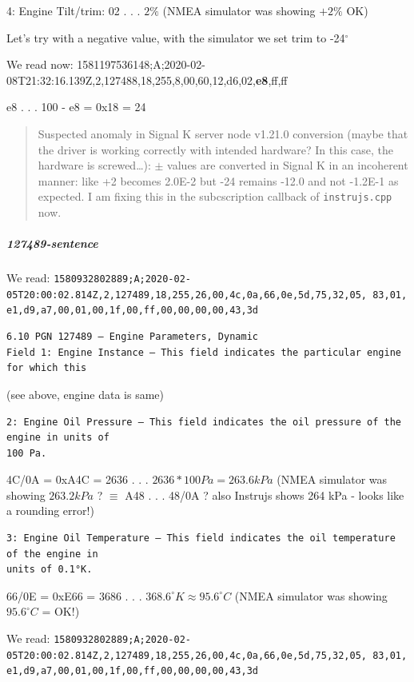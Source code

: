 \documentclass[11pt]{article}
\begin{document}
    4: Engine Tilt/trim: 02 . . . \(2\%\) (NMEA simulator was showing
\(+2\%\) OK)

    Let's try with a negative value, with the simulator we set trim to
-24\(^{\circ}\)

    We read now:
1581197536148;A;2020-02-08T21:32:16.139Z,2,127488,18,255,8,00,60,12,d6,02,\textbf{e8},ff,ff

    e8 . . . 100 - e8 = 0x18 = 24

    \begin{quote}
Suspected anomaly in Signal K server node v1.21.0 conversion (maybe that
the driver is working correctly with intended hardware? In this case,
the hardware is screwed\ldots): \(\pm\) values are converted in Signal K
in an incoherent manner: like +2 becomes 2.0E-2 but -24 remains -12.0
and not -1.2E-1 as expected. I am fixing this in the subcscription
callback of \texttt{instrujs.cpp} now.
\end{quote}

    \hypertarget{sentence}{%
\subparagraph{127489-sentence}\label{sentence}}

    We read:
\texttt{1580932802889;A;2020-02-05T20:00:02.814Z,2,127489,18,255,26,00,4c,0a,66,0e,5d,75,32,05,\ 83,01,e1,d9,a7,00,01,00,1f,00,ff,00,00,00,00,43,3d}

\begin{verbatim}
6.10 PGN 127489 – Engine Parameters, Dynamic
Field 1: Engine Instance – This field indicates the particular engine for which this
\end{verbatim}

(see above, engine data is same)

\begin{verbatim}
2: Engine Oil Pressure – This field indicates the oil pressure of the engine in units of
100 Pa.
\end{verbatim}

4C/0A = 0xA4C = 2636 . . . \(2636 * 100Pa = 263.6kPa\) (NMEA simulator
was showing \(263.2kPa\) ? \(\equiv\) A48 . . . 48/0A ? also Instrujs
shows 264 kPa - looks like a rounding error!)

    \begin{verbatim}
3: Engine Oil Temperature – This field indicates the oil temperature of the engine in
units of 0.1°K.
\end{verbatim}

66/0E = 0xE66 = 3686 . . . \(368.6^{\circ}K \approx 95.6^{\circ}C\)
(NMEA simulator was showing \(95.6^{\circ}C\) = OK!)

    We read:
\texttt{1580932802889;A;2020-02-05T20:00:02.814Z,2,127489,18,255,26,00,4c,0a,66,0e,5d,75,32,05,\ 83,01,e1,d9,a7,00,01,00,1f,00,ff,00,00,00,00,43,3d}
\end{document}
